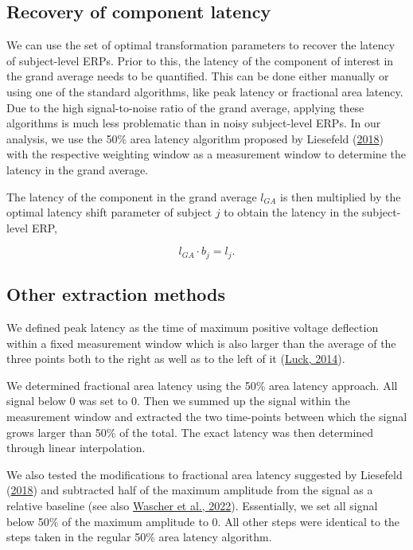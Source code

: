 \documentclass[
  man]{apa7}
\begin{document}
\hypertarget{recovery-of-component-latency}{%
\subsection{Recovery of component latency}\label{recovery-of-component-latency}}

We can use the set of optimal transformation parameters to recover the latency of subject-level ERPs. Prior to this, the latency of the component of interest in the grand average needs to be quantified. This can be done either manually or using one of the standard algorithms, like peak latency or fractional area latency. Due to the high signal-to-noise ratio of the grand average, applying these algorithms is much less problematic than in noisy subject-level ERPs. In our analysis, we use the 50\% area latency algorithm proposed by Liesefeld (\protect\hyperlink{ref-liesefeld2018estimating}{2018}) with the respective weighting window as a measurement window to determine the latency in the grand average.

The latency of the component in the grand average \(l_{GA}\) is then multiplied by the optimal latency shift parameter of subject \(j\) to obtain the latency in the subject-level ERP,

\[l_{GA} \cdot b_j = l_{j}.\]

\hypertarget{other-extraction-methods}{%
\subsection{Other extraction methods}\label{other-extraction-methods}}

We defined peak latency as the time of maximum positive voltage deflection within a fixed measurement window which is also larger than the average of the three points both to the right as well as to the left of it (\protect\hyperlink{ref-luck2014introduction}{Luck, 2014}).

We determined fractional area latency using the 50\% area latency approach. All signal below 0 was set to 0. Then we summed up the signal within the measurement window and extracted the two time-points between which the signal grows larger than 50\% of the total. The exact latency was then determined through linear interpolation.

We also tested the modifications to fractional area latency suggested by Liesefeld (\protect\hyperlink{ref-liesefeld2018estimating}{2018}) and subtracted half of the maximum amplitude from the signal as a relative baseline (see also \protect\hyperlink{ref-wascher2022mental}{Wascher et al., 2022}). Essentially, we set all signal below 50\% of the maximum amplitude to 0. All other steps were identical to the steps taken in the regular 50\% area latency algorithm.
\end{document}
